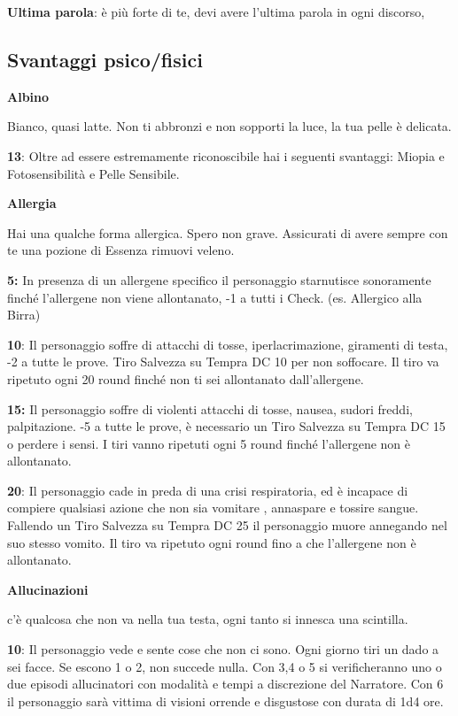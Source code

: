 \documentclass[a4paper,11pt,twoside,openany]{book}
\begin{document}
\textbf{Ultima parola}: è più forte di te, devi avere l'ultima parola in ogni discorso,

\pagebreak

\subsection{Svantaggi psico/fisici}

\label{svantaggi-psicofisici}

\textbf{Albino}

Bianco, quasi latte. Non ti abbronzi e non sopporti la luce, la tua pelle è delicata.

\textbf{13}: Oltre ad essere estremamente riconoscibile hai i seguenti svantaggi: Miopia e Fotosensibilità e Pelle Sensibile.

\textbf{Allergia}

Hai una qualche forma allergica. Spero non grave. Assicurati di avere sempre con te una pozione di Essenza rimuovi veleno.

\textbf{5:} In presenza di un allergene specifico il personaggio starnutisce sonoramente finché l'allergene non viene allontanato, -1 a tutti i Check. (es. Allergico alla Birra)

\textbf{10}: Il personaggio soffre di attacchi di tosse, iperlacrimazione, giramenti di testa, -2 a tutte le prove. Tiro Salvezza su Tempra DC 10 per non soffocare. Il tiro va ripetuto ogni 20 round finché non ti sei allontanato dall'allergene.

\textbf{15:} Il personaggio soffre di violenti attacchi di tosse, nausea, sudori freddi, palpitazione. -5 a tutte le prove, è necessario un Tiro Salvezza su Tempra DC 15 o perdere i sensi. I tiri vanno ripetuti ogni 5 round finché l'allergene non è allontanato.

\textbf{20}: Il personaggio cade in preda di una crisi respiratoria, ed è incapace di compiere qualsiasi azione che non sia vomitare , annaspare e tossire sangue. Fallendo un Tiro Salvezza su Tempra DC 25 il personaggio muore annegando nel suo stesso vomito. Il tiro va ripetuto ogni round fino a che l'allergene non è allontanato.

\textbf{Allucinazioni}

c'è qualcosa che non va nella tua testa, ogni tanto si innesca una scintilla.

\textbf{10}: Il personaggio vede e sente cose che non ci sono. Ogni giorno tiri un dado a sei facce.
Se escono 1 o 2, non succede nulla.
Con 3,4 o 5 si verificheranno uno o due episodi allucinatori con modalità e tempi a discrezione del Narratore.
Con 6 il personaggio sarà vittima di visioni orrende e disgustose con durata di 1d4 ore.
\end{document}

